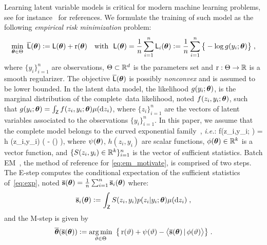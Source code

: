 \documentclass[journal, 11pt]{IEEEtran}
\begin{document}
Learning latent variable models is critical for modern machine learning problems, see for instance~\cite{mclachlan2007algorithm} for references.
We formulate the training of such model as the following \emph{empirical risk minimization} problem:
\begin{align} \label{eq:em_motivate}
\begin{split} 
 \min_{ \param \in \Param }~ \overline{\calL} ( \param ) \eqdef  \calL ( \param ) + \Pen (\param) \quad \text{with}~~\calL ( \param ) = \frac{1}{n} \sum_{i=1}^n \calL_i( \param) \eqdef  \frac{1}{n} \sum_{i=1}^n \big\{ - \log g( y_i ; \param ) \big\}\eqs,
\end{split} 
\end{align}
where $\{y_i\}_{i=1}^n$ are observations, $\Theta \subset \mathbb{R}^d$ is the parameters set and $\operatorname{r} : \Theta \rightarrow \mathbb{R}$ is a smooth regularizer.
The objective $ \overline{{\textsf{L}}} ( {\bm{\theta}} )$ is possibly \emph{nonconvex} and is assumed to be lower bounded. 
In the latent data model, the likelihood $g(y_i ; {\bm{\theta}})$, is the marginal distribution of the complete~data likelihood, noted $f(z_i,y_i; {\bm{\theta}})$, such that $g(y_i; {\bm{\theta}}) = \int_{\mathsf{Z}} f (z_i,y_i;{\bm{\theta}}) \mu(\mathrm d z_i)$, where $\{ z_i \}_{i=1}^n$ are the vectors of latent variables associated to the observations $\{y_i\}_{i=1}^n$.
In this paper, we assume that the complete model belongs to the curved exponential family~\cite{efron1975defining}, \textit{i.e.}:
\beq \label{eq:exp}
f(z_i,y_i; \param) = h  (z_i,y_i) \exp \big(  - \psi(\param) \big)\eqs,
\eeq
where $\psi({\bm{\theta}})$, $h(z_i,y_i)$ are scalar functions, $\phi({\bm{\theta}}) \in \mathbb{R}^k$ is a vector function, and $\{S(z_i,y_i) \in \mathbb{R}^k\}_{i=1}^n$ is the vector of sufficient statistics.
Batch EM~\cite{dempster1977Maximum, wu1983convergence}, the method of reference for \eqref{eq:em_motivate}, is comprised of two steps. 
The \textsf{E-step} computes the conditional expectation of the sufficient statistics of~\eqref{eq:exp}, noted $\overline{{\mathbf{s}}}({\bm{\theta}})= \frac{1}{n} \sum_{i=1}^n \overline{{\mathbf{s}}}_i({\bm{\theta}})$ where:
\begin{align}\label{eq:definition-overline-bss}
 \overline{\bss}_i(\param) \eqdef \int_{\Zset} S(z_i,y_i) p(z_i|y_i;\param) \mu(\rmd z_i) \eqsp,
\end{align}
and the \textsf{M-step} is given by
\begin{align}\label{eq:mstep}
\overline{\param}( \overline{\bss}(\param) ) \eqdef \argmin_{ \vartheta \in \Param } ~\big\{ \Pen( \vartheta ) + \psi( \vartheta) - \pscal{ \overline{\bss}(\param)}{ \phi ( \vartheta) } \big\} \eqsp.
\end{align}
\end{document}
